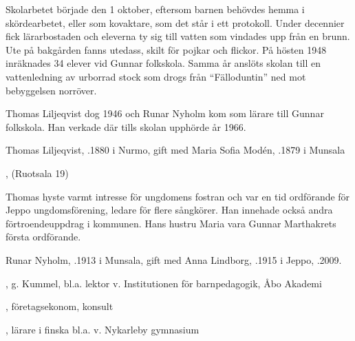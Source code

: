 Skolarbetet började den 1 oktober, eftersom barnen behövdes hemma i skördearbetet, eller som kovaktare, som det står i ett protokoll. Under decennier fick lärarbostaden och eleverna ty sig till vatten som vindades upp från en brunn. Ute på bakgården fanns utedass, skilt för pojkar och flickor. På hösten 1948 inräknades 34 elever vid Gunnar folkskola. Samma år anslöts skolan till en vattenledning av urborrad stock som drogs från ``Fälloduntin'' ned mot bebyggelsen norröver.

Thomas Liljeqvist dog 1946 och Runar Nyholm kom som lärare till Gunnar folkskola. Han verkade där tills skolan upphörde år 1966.



Thomas Liljeqvist, .1880 i Nurmo, gift med Maria Sofia Modén,  .1879 i Munsala

\begin{jhchildren}
  \item {}
  \item {}
  \item {}
  \item {}
  \item {}, (Ruotsala 19)
\end{jhchildren}

Thomas hyste varmt intresse för ungdomens fostran och var en tid ordförande för Jeppo ungdomsförening, ledare för flere sångkörer. Han innehade också andra förtroendeuppdrag i kommunen. Hans hustru Maria vara Gunnar Marthakrets första ordförande.

Runar Nyholm, .1913 i Munsala, gift med Anna Lindborg, .1915 i Jeppo, .2009.

\begin{jhchildren}
  \item {}, g. Kummel, bl.a. lektor v. Institutionen för barnpedagogik, Åbo Akademi
  \item {}, företagsekonom, konsult
  \item {},  lärare i finska bl.a. v. Nykarleby gymnasium
\end{jhchildren}

